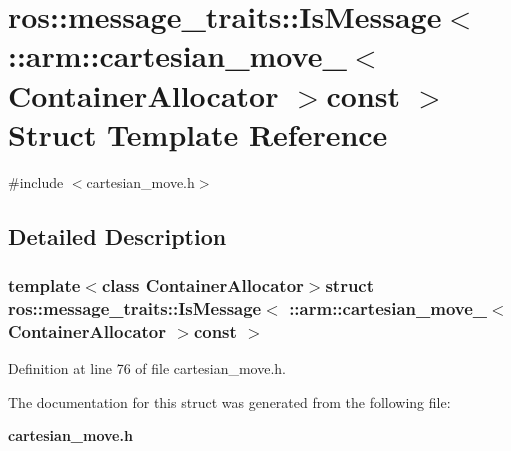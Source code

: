 \section{ros\-:\-:message\-\_\-traits\-:\-:\-Is\-Message$<$ \-:\-:arm\-:\-:cartesian\-\_\-move\-\_\-$<$ \-Container\-Allocator $>$const $>$ \-Struct \-Template \-Reference}
\label{structros_1_1message__traits_1_1IsMessage_3_01_1_1arm_1_1cartesian__move___3_01ContainerAllocator_01_4const_01_01_4}


{\ttfamily \#include $<$cartesian\-\_\-move.\-h$>$}



\subsection{\-Detailed \-Description}
\subsubsection*{template$<$class Container\-Allocator$>$struct ros\-::message\-\_\-traits\-::\-Is\-Message$<$ \-::arm\-::cartesian\-\_\-move\-\_\-$<$ Container\-Allocator $>$const  $>$}



\-Definition at line 76 of file cartesian\-\_\-move.\-h.



\-The documentation for this struct was generated from the following file\-:\begin{DoxyCompactItemize}
\item 
{\bf cartesian\-\_\-move.\-h}\end{DoxyCompactItemize}
